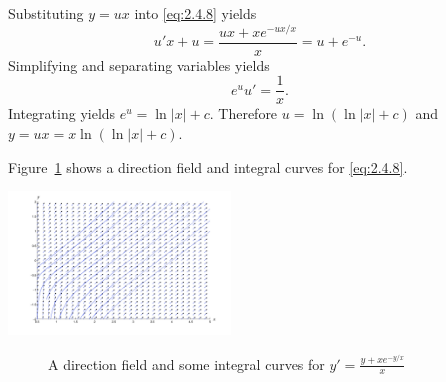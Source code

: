 \documentclass{ximera}
\begin{document}
\solution Substituting  $y=ux$
into \eqref{eq:2.4.8} yields
$$
u'x+u =  \frac{ux+xe^{-ux/x}}{x} = u+e^{-u}.
$$
 Simplifying and separating variables yields
$$
e^uu'=\frac{1}{x}.
$$
Integrating yields
$e^u=\ln |x|+c$.
Therefore
$u=\ln(\ln|x|+c)$ and
$y=ux=x \ln (\ln |x|+c)$.

Figure~\ref{figure:2.4.2} shows
a direction field and integral curves for \eqref{eq:2.4.8}.


\begin{image}
\includegraphics[height=1.5in]{fig020402.jpg}
\end{image}
\begin{center}
\begin{figure}
\caption
{A direction field and some integral curves for
$y'=\frac{y+xe^{-y/x}}{x}$}
  \label{figure:2.4.2}
\end{figure}
\end{center}
\end{document}
